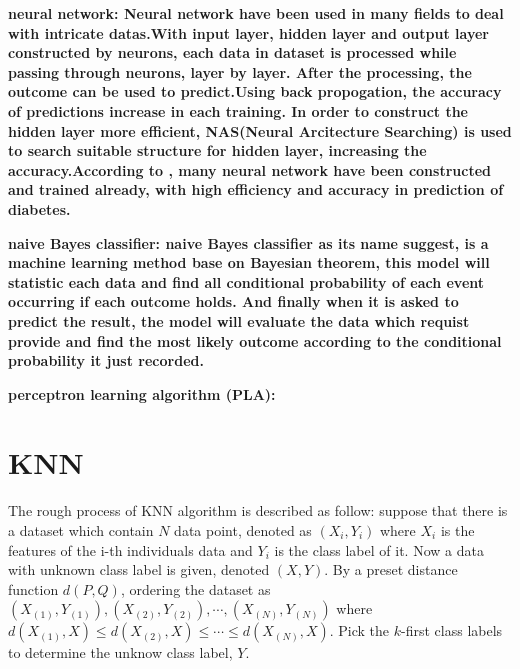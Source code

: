 \documentclass[twocolumn,10pt]{article}
\begin{document}
  \bf{neural network}: \rm{Neural} network have been used in many fields to deal with intricate datas.With input layer, hidden 
  layer and output layer constructed by neurons, each data in dataset is processed while passing through neurons, layer by layer. 
  After the processing, the outcome can be used to predict.Using back propogation, the accuracy of predictions increase in each 
  training. In order to construct the hidden layer more efficient, NAS(Neural Arcitecture Searching) is used to search suitable 
  structure for hidden layer, increasing the accuracy.According to \cite{Gadekallu2020}\cite{Beghriche2021}, many neural network 
  have been constructed and trained already, with high efficiency and accuracy in prediction of diabetes.

  \bf{naive Bayes classifier}: \rm{naive Bayes classifier} as its name suggest, is a machine learning method base on Bayesian 
  theorem, this model will statistic each data and find all conditional probability of each event occurring if each outcome holds. 
  And finally when it is asked to predict the result, the model will evaluate the data which requist provide and find the most 
  likely outcome according to the conditional probability it just recorded. 

  \bf{perceptron learning algorithm (PLA)}: 

\section{KNN}
  \rm{The} rough process of KNN algorithm is described as follow: suppose that there is a dataset which contain $N$ data point, denoted as 
  $(X_i,Y_i)$ where $X_i$ is the features of the i-th individuals data and $Y_i$ is the class label of it. Now 
  a data with unknown class label is given, denoted $(X, Y)$. By a preset distance function $d(P, Q)$, ordering the dataset 
  as $(X_{(1)}, Y_{(1)}), (X_{(2)}, Y_{(2)}), \cdots, (X_{(N)}, Y_{(N)})$ where $d(X_{(1)}, X)\leq d(X_{(2)}, X)\leq\cdots\leq d(X_{(N)}, X)$. 
  Pick the $k$-first class labels to determine the unknow class label, $Y$.
\end{document}
